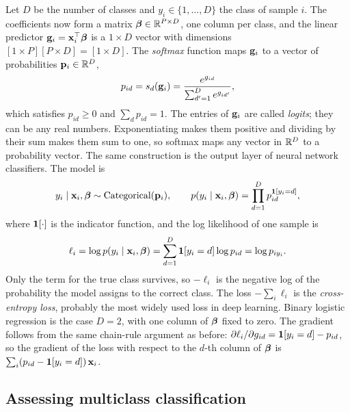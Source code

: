 Let $D$ be the number of classes and $y_i\in\{1,\dots,D\}$ the class of sample $i$. The coefficients now form a matrix $\boldsymbol{\beta}\in\mathbb{R}^{P\times D}$, one column per class, and the linear predictor $\mathbf{g}_i=\mathbf{x}_i^\top\boldsymbol{\beta}$ is a $1\times D$ vector with dimensions $[1\times P][P\times D]=[1\times D]$. The \emph{softmax} function maps $\mathbf{g}_i$ to a vector of probabilities $\mathbf{p}_i\in\mathbb{R}^D$,
\begin{equation}
  p_{id} = s_d(\mathbf{g}_i) = \frac{e^{g_{id}}}{\sum_{d'=1}^D e^{g_{id'}}},
\end{equation}
which satisfies $p_{id}\geq 0$ and $\sum_d p_{id}=1$. The entries of $\mathbf{g}_i$ are called \emph{logits}; they can be any real numbers. Exponentiating makes them positive and dividing by their sum makes them sum to one, so softmax maps any vector in $\mathbb{R}^D$ to a probability vector. The same construction is the output layer of neural network classifiers. The model is
\begin{equation}
  y_i\mid\mathbf{x}_i,\boldsymbol{\beta} \sim \text{Categorical}(\mathbf{p}_i), \qquad p(y_i\mid\mathbf{x}_i,\boldsymbol{\beta}) = \prod_{d=1}^D p_{id}^{\mathbf{1}[y_i=d]},
\end{equation}
where $\mathbf{1}[\cdot]$ is the indicator function, and the log likelihood of one sample is
\begin{equation}
  \ell_i = \log p(y_i\mid\mathbf{x}_i,\boldsymbol{\beta}) = \sum_{d=1}^D\mathbf{1}[y_i=d]\log p_{id} = \log p_{i y_i}.
\end{equation}
Only the term for the true class survives, so $-\ell_i$ is the negative log of the probability the model assigns to the correct class. The loss $-\sum_i\ell_i$ is the \emph{cross-entropy loss}, probably the most widely used loss in deep learning. Binary logistic regression is the case $D=2$, with one column of $\boldsymbol{\beta}$ fixed to zero. The gradient follows from the same chain-rule argument as before: $\partial\ell_i/\partial g_{id}=\mathbf{1}[y_i=d]-p_{id}$, so the gradient of the loss with respect to the $d$-th column of $\boldsymbol{\beta}$ is $\sum_i(p_{id}-\mathbf{1}[y_i=d])\,\mathbf{x}_i$.

\subsection{Assessing multiclass classification}

